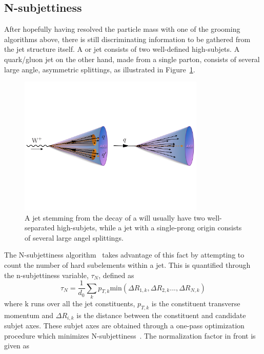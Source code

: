 \subsection{N-subjettiness}
After hopefully having resolved the particle mass with one of the grooming algorithms above, there is still discriminating information to be gathered from the jet structure itself.
A \PW or \PZ jet consists of two well-defined high-\PT subjets. A quark/gluon jet on the other hand, made from a single parton, consists of several large angle, asymmetric splittings, as illustrated in Figure~\ref{fig:objreco:onevstwoprong}.
\begin{figure}[h!] 
    \centering 
    \includegraphics[width=0.790\textwidth]{figures/event_reconstruction/tau21_sketch.pdf}
     \caption{A jet stemming from the decay of a \PW will usually have two well-separated high-\pt subjets, while a jet with a single-prong origin consists of several large angel splittings.}
     \label{fig:objreco:onevstwoprong}
 \end{figure}
The N-subjettiness algorithm~\cite{Thaler:2010tr} takes advantage of this fact by attempting to count the number of hard subelements within a jet. This is quantified through the n-subjettiness variable, $\tau_N$, defined as
 \begin{equation}
 \tau_N = \frac{1}{d_0} \sum_k p_{T,k}\textrm{min}( \Delta R_{1,k},\Delta R_{2,k}...,\Delta R_{N,k})
 \end{equation} 
where k runs over all the jet constituents, $p_{T,k}$ is the constituent transverse momentum and $\Delta R_{i,k}$ is the distance between the constituent and candidate subjet axes. These subjet axes are obtained through a one-pass optimization procedure which minimizes N-subjettiness~\cite{Thaler2012}. The normalization factor in front is given as
